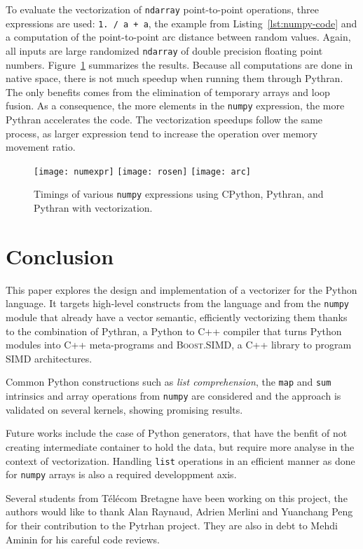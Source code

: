 \documentclass[preprint]{sigplanconf}
\providecommand{\boostsimd}{\textsc{Boost.SIMD}}
\begin{document}
To evaluate the vectorization of \texttt{ndarray} point-to-point operations,
three expressions are used: \texttt{1. / a + a}, the example from
Listing~\ref{lst:numpy-code} and a computation of the point-to-point arc
distance  between random values. Again, all inputs are large randomized
\texttt{ndarray} of double precision floating point numbers.
Figure~\ref{fig:numpy-timings} summarizes the results. Because all computations
are done in native space, there is not much speedup when running them through
Pythran. The only benefits comes from the elimination of temporary arrays and
loop fusion. As a consequence, the more elements in the \texttt{numpy}
expression, the more Pythran accelerates the code. The vectorization speedups
follow the same process, as larger expression tend to increase the operation
over memory movement ratio.

\begin{figure}[ht]

    \texttt{[image: numexpr]}
    \texttt{[image: rosen]}
    \texttt{[image: arc]}
    \caption{Timings of various \texttt{numpy} expressions using CPython, Pythran, and Pythran with vectorization.}
    \label{fig:numpy-timings}

\end{figure}

\section*{Conclusion}

This paper explores the design and implementation of a vectorizer for the
Python language. It targets high-level constructs from the language and from
the \texttt{numpy} module that already have a vector semantic, efficiently
vectorizing them thanks to the combination of Pythran, a Python to C++ compiler
that turns Python modules into C++ meta-programs and \boostsimd, a C++ library
to program SIMD architectures.

Common Python constructions such as \emph{list comprehension}, the \texttt{map}
and \texttt{sum} intrinsics and array operations from \texttt{numpy} are
considered and the approach is validated on several kernels, showing
promising results.

Future works include the case of Python generators, that have the benfit of not
creating intermediate container to hold the data, but require more analyse in
the context of vectorization. Handling \texttt{list} operations in an efficient
manner as done for \texttt{numpy} arrays is also a required developpment axis.

\acks

Several students from Télécom Bretagne have been working on this project, the
authors would like to thank Alan Raynaud, Adrien Merlini and Yuanchang Peng for
their contribution to the Pytrhan project. They are also in debt to Mehdi
Aminin for his careful code reviews.





\end{document}
